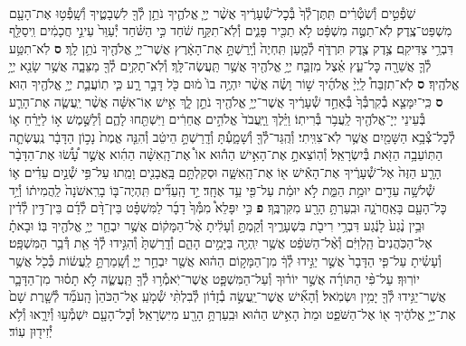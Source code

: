 \documentclass[twoside, openany, parskip=half, 11pt]{book}
\begin{document}
\begin{footnotesize}
\begin{multicols}{2}
\\
שֹֽׁפְ֯טִ֣ים וְ֯שֹֽׁטְ֯רִ֗ים תִּֽתֶּן־לְ֯ךָ֙ בְּ֯כׇל־שְׁ֯עָרֶ֔יךָ אֲשֶׁ֨ר יְיָ֧ אֱלֹהֶ֛יךָ נֹתֵ֥ן לְ֯ךָ֖ לִשְׁבָטֶ֑יךָ וְ֯שָֽׁפְ֯ט֥וּ אֶת־הָעָ֖ם מִשְׁפַּט־צֶֽדֶק׃ לֹֽא־תַטֶּ֣ה מִשְׁפָּ֔ט לֹ֥א תַכִּ֖יר פָּנִ֑ים וְ֯לֹֽא־תִקַּ֣ח שֹׁ֔חַד כִּ֣י הַשֹּׁ֗חַד יְ֯עַוֵּר֙ עֵינֵ֣י חֲכָמִ֔ים וִֽיסַלֵּ֖ף דִּבְרֵ֥י צַדִּיקִֽם׃ צֶ֥דֶק צֶ֖דֶק תִּרְדֹּ֑ף לְ֯מַ֤עַן תִּֽחְיֶה֙ וְ֯יָֽרַשְׁתָּ֣ אֶת־הָאָ֔רֶץ אֲשֶׁר־יְיָ֥ אֱלֹהֶ֖יךָ נֹתֵ֥ן לָֽךְ׃ \textbf{ס}
לֹֽא־תִטַּ֥ע לְ֯ךָ֛ אֲשֵׁרָ֖ה כׇּל־עֵ֑ץ אֵ֗צֶל מִזְבַּ֛ח יְיָ֥ אֱלֹהֶ֖יךָ אֲשֶׁ֥ר תַּֽעֲשֶׂה־לָּֽךְ׃ וְ֯לֹֽא־תָקִ֥ים לְ֯ךָ֖ מַצֵּבָ֑ה אֲשֶׁ֥ר שָׂנֵ֖א יְיָ֥ אֱלֹהֶֽיךָ׃ \textbf{ס} לֹֽא־תִזְבַּח֩ לַֽיְיָ֨ אֱלֹהֶ֜יךָ שׁ֣וֹר וָשֶׂ֗ה אֲשֶׁ֨ר יִהְיֶ֥ה בוֹ֙ מ֔וּם כֹּ֖ל דָּבָ֣ר רָ֑ע כִּ֧י תֽוֹעֲבַ֛ת יְיָ֥ אֱלֹהֶ֖יךָ הֽוּא׃ \textbf{ס} כִּֽי־יִמָּצֵ֤א בְ֯קִרְבְּ֯ךָ֙ בְּ֯אַחַ֣ד שְׁ֯עָרֶ֔יךָ אֲשֶׁר־יְיָ֥ אֱלֹהֶ֖יךָ נֹתֵ֣ן לָ֑ךְ אִ֣ישׁ אֽוֹ־אִשָּׁ֗ה אֲשֶׁ֨ר יַֽעֲשֶׂ֧ה אֶת־הָרַ֛ע בְּ֯עֵינֵי יְיָ־אֱלֹהֶ֖יךָ לַֽעֲבֹ֥ר בְּ֯רִיתֽוֹ׃ וַיֵּ֗לֶךְ וַֽיַּֽעֲבֹד֙ אֱלֹהִ֣ים אֲחֵרִ֔ים וַיִּשְׁתַּ֖חוּ לָהֶ֑ם וְ֯לַשֶּׁ֣מֶשׁ א֣וֹ לַיָּרֵ֗חַ א֛וֹ לְ֯כׇל־צְ֯בָ֥א הַשָּׁמַ֖יִם אֲשֶׁ֥ר לֹֽא־צִוִּֽיתִי׃ וְ֯הֻֽגַּד־לְ֯ךָ֖ וְ֯שָׁמָ֑עְ֯תָּ וְ֯דָֽרַשְׁתָּ֣ הֵיטֵ֔ב וְ֯הִנֵּ֤ה אֱמֶת֙ נָכ֣וֹן הַדָּבָ֔ר נֶֽעֶשְׂתָ֛ה הַתּֽוֹעֵבָ֥ה הַזֹּ֖את בְּ֯יִשְׂרָאֵֽל׃ וְ֯הֽוֹצֵאתָ֣ אֶת־הָאִ֣ישׁ הַה֡וּא אוֹ֩ אֶת־הָֽאִשָּׁ֨ה הַהִ֜וא אֲשֶׁ֣ר עָ֠שׂ֠וּ אֶת־הַדָּבָ֨ר הָרָ֤ע הַזֶּה֙ אֶל־שְׁ֯עָרֶ֔יךָ אֶת־הָאִ֕ישׁ א֖וֹ אֶת־הָֽאִשָּׁ֑ה וּסְקַלְתָּ֥ם בָּֽאֲבָנִ֖ים וָמֵֽתוּ׃ עַל־פִּ֣י שְׁ֯נַ֣יִם עֵדִ֗ים א֛וֹ שְׁ֯לשָׁ֥ה עֵדִ֖ים יוּמַ֣ת הַמֵּ֑ת לֹ֣א יוּמַ֔ת עַל־פִּ֖י עֵ֥ד אֶחָֽד׃ יַ֣ד הָֽעֵדִ֞ים תִּֽהְיֶה־בּ֤וֹ בָרִֽאשֹׁנָה֙ לַֽהֲמִית֔וֹ וְ֯יַ֥ד כׇּל־הָעָ֖ם בָּאַֽחֲרֹנָ֑ה וּבִֽעַרְתָּ֥ הָרָ֖ע מִקִּרְבֶּֽךָ׃ \textbf{פ}
כִּ֣י יִפָּלֵא֩ מִמְּ֯ךָ֙ דָבָ֜ר לַמִּשְׁפָּ֗ט בֵּין־דָּ֨ם לְ֯דָ֜ם בֵּין־דִּ֣ין לְ֯דִ֗ין וּבֵ֥ין נֶ֨גַע֙ לָנֶ֔גַע דִּבְרֵ֥י רִיבֹ֖ת בִּשְׁעָרֶ֑יךָ וְ֯קַמְתָּ֣ וְ֯עָלִ֔יתָ אֶ֨ל־הַמָּק֔וֹם אֲשֶׁ֥ר יִבְחַ֛ר יְיָ֥ אֱלֹהֶ֖יךָ בּֽוֹ׃ וּבָאתָ֗ אֶל־הַכֹּֽהֲנִים֙ הַֽלְוִיִּ֔ם וְ֯אֶ֨ל־הַשֹּׁפֵ֔ט אֲשֶׁ֥ר יִֽהְיֶ֖ה בַּיָּמִ֣ים הָהֵ֑ם וְ֯דָֽרַשְׁתָּ֙ וְ֯הִגִּ֣ידוּ לְ֯ךָ֔ אֵ֖ת דְּ֯בַ֥ר הַמִּשְׁפָּֽט׃ וְ֯עָשִׂ֗יתָ עַל־פִּ֤י הַדָּבָר֙ אֲשֶׁ֣ר יַגִּ֣ידוּ לְ֯ךָ֔ מִן־הַמָּק֣וֹם הַה֔וּא אֲשֶׁ֖ר יִבְחַ֣ר יְיָ֑ וְ֯שָֽׁמַרְתָּ֣ לַֽעֲשׂ֔וֹת כְּ֯כֹ֖ל אֲשֶׁ֥ר יוֹרֽוּךָ׃
עַל־פִּ֨י הַתּוֹרָ֜ה אֲשֶׁ֣ר יוֹר֗וּךָ וְ֯עַל־הַמִּשְׁפָּ֛ט אֲשֶׁר־יֹֽאמְ֯ר֥וּ לְ֯ךָ֖ תַּֽעֲשֶׂ֑ה לֹ֣א תָס֗וּר מִן־הַדָּבָ֛ר אֲשֶׁר־יַגִּ֥ידוּ לְ֯ךָ֖ יָמִ֥ין וּשְׂמֹֽאל׃ וְ֯הָאִ֞ישׁ אֲשֶׁר־יַֽעֲשֶׂ֣ה בְ֯זָד֗וֹן לְ֯בִלְתִּ֨י שְׁ֯מֹ֤עַֽ אֶל־הַכֹּהֵן֙ הָֽעֹמֵ֞ד לְ֯שָׁ֤רֶת שָׁם֙ אֶת־יְיָ֣ אֱלֹהֶ֔יךָ א֖וֹ אֶל־הַשֹּׁפֵ֑ט וּמֵת֙ הָאִ֣ישׁ הַה֔וּא וּבִֽעַרְתָּ֥ הָרָ֖ע מִיִּשְׂרָאֵֽל׃ וְ֯כׇל־הָעָ֖ם יִשְׁמְ֯ע֣וּ וְ֯יִרָ֑אוּ וְ֯לֹ֥א יְ֯זִיד֖וּן עֽוֹד׃


\end{multicols}
\end{footnotesize}
\end{document}
